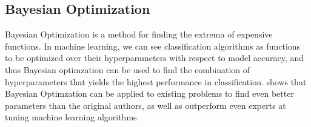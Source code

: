 \subsection{Bayesian Optimization}\label{sec:bayesianoptimization}
Bayesian Optimization is a method for finding the extrema of expensive functions. In machine learning, we can see classification algorithms as functions to be optimized over their hyperparameters with respect to model accuracy, and thus Bayesian optimzation can be used to find the combination of hyperparameters that yields the highest performance in classification. \citet{snoek2012practical} shows that Bayesian Optimzation can be applied to existing problems to find even better parameters than the original authors, as well as outperform even experts at tuning machine learning algorithms. 

